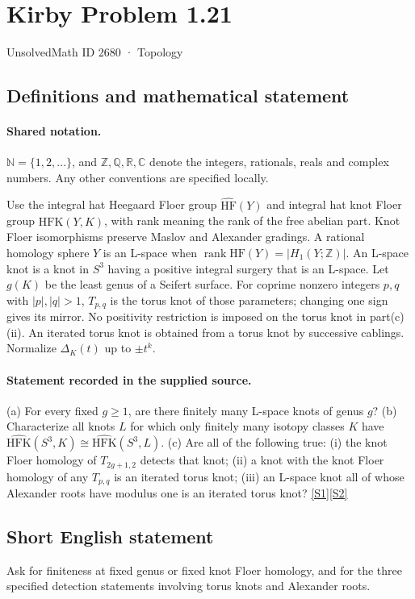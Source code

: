 \documentclass[11pt]{article}
\newcommand{\sref}[2]{\hyperlink{source:#1:#2}{[S#2]}}
\begin{document}
\setcounter{section}{2679}
\section{Kirby Problem 1.21}\label{2680}
{\small\sffamily UnsolvedMath ID 2680 · Topology}
\subsection{Definitions and mathematical statement}

\paragraph{Shared notation.}$\mathbb N=\{1,2,\ldots\}$, and $\mathbb Z,\mathbb Q,\mathbb R,\mathbb C$ denote the integers, rationals, reals and complex numbers. Any other conventions are specified locally.


Use the integral hat Heegaard Floer group $\widehat{\mathrm{HF}}(Y)$ and integral hat knot Floer group $\widehat{\mathrm{HFK}}(Y,K)$, with rank meaning the rank of the free abelian part. Knot Floer isomorphisms preserve Maslov and Alexander gradings. A rational homology sphere $Y$ is an L-space when $\operatorname{rank}\widehat{\mathrm{HF}}(Y)=|H_1(Y;\mathbb Z)|$. An L-space knot is a knot in $S^3$ having a positive integral surgery that is an L-space. Let $g(K)$ be the least genus of a Seifert surface. For coprime nonzero integers $p,q$ with $|p|,|q|>1$, $T_{p,q}$ is the torus knot of those parameters; changing one sign gives its mirror. No positivity restriction is imposed on the torus knot in part(c)(ii). An iterated torus knot is obtained from a torus knot by successive cablings. Normalize $\Delta_K(t)$ up to $\pm t^k$.
\paragraph{Statement recorded in the supplied source.}
(a) For every fixed $g\geq1$, are there finitely many L-space knots of genus $g$? (b) Characterize all knots $L$ for which only finitely many isotopy classes $K$ have $\widehat{\mathrm{HFK}}(S^3,K)\cong\widehat{\mathrm{HFK}}(S^3,L)$. (c) Are all of the following true: (i) the knot Floer homology of $T_{2g+1,2}$ detects that knot; (ii) a knot with the knot Floer homology of any $T_{p,q}$ is an iterated torus knot; (iii) an L-space knot all of whose Alexander roots have modulus one is an iterated torus knot? \sref{2680}{1}\sref{2680}{2}
\subsection{Short English statement}
Ask for finiteness at fixed genus or fixed knot Floer homology, and for the three specified detection statements involving torus knots and Alexander roots.
\end{document}
